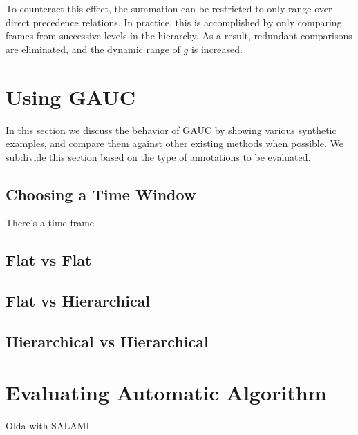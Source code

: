 \documentclass{article}
\begin{document}
To counteract this effect, the summation can be restricted to only range over direct
precedence relations.  In practice, this is accomplished by only comparing frames from
successive levels in the hierarchy.  As a result, redundant comparisons are
eliminated, and the dynamic range of $g$ is increased.

\section{Using GAUC}\label{sec:using_method}

In this section we discuss the behavior of GAUC by showing various synthetic examples, and compare them against other existing methods when possible.
We subdivide this section based on the type of annotations to be evaluated.

\subsection{Choosing a Time Window}

There's a time frame 


\subsection{Flat vs Flat}


\subsection{Flat vs Hierarchical}

\subsection{Hierarchical vs Hierarchical}

\section{Evaluating Automatic Algorithm}

Olda with SALAMI.


\end{document}
